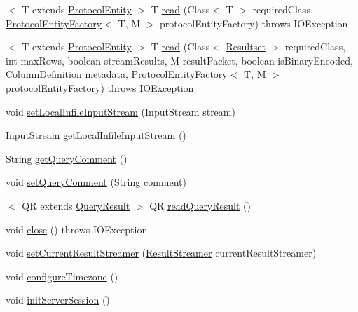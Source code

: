 \begin{DoxyCompactItemize}
$<$ T extends \mbox{\hyperlink{interfacecom_1_1mysql_1_1cj_1_1protocol_1_1_protocol_entity}{Protocol\+Entity}} $>$ T \mbox{\hyperlink{interfacecom_1_1mysql_1_1cj_1_1protocol_1_1_protocol_a48ee5ee3c590b73b47b2094694730319}{read}} (Class$<$ T $>$ required\+Class, \mbox{\hyperlink{interfacecom_1_1mysql_1_1cj_1_1protocol_1_1_protocol_entity_factory}{Protocol\+Entity\+Factory}}$<$ T, M $>$ protocol\+Entity\+Factory)  throws I\+O\+Exception
\item 
$<$ T extends \mbox{\hyperlink{interfacecom_1_1mysql_1_1cj_1_1protocol_1_1_protocol_entity}{Protocol\+Entity}} $>$ T \mbox{\hyperlink{interfacecom_1_1mysql_1_1cj_1_1protocol_1_1_protocol_ae33a71067b314435408526d35f521207}{read}} (Class$<$ \mbox{\hyperlink{interfacecom_1_1mysql_1_1cj_1_1protocol_1_1_resultset}{Resultset}} $>$ required\+Class, int max\+Rows, boolean stream\+Results, M result\+Packet, boolean is\+Binary\+Encoded, \mbox{\hyperlink{interfacecom_1_1mysql_1_1cj_1_1protocol_1_1_column_definition}{Column\+Definition}} metadata, \mbox{\hyperlink{interfacecom_1_1mysql_1_1cj_1_1protocol_1_1_protocol_entity_factory}{Protocol\+Entity\+Factory}}$<$ T, M $>$ protocol\+Entity\+Factory)  throws I\+O\+Exception
\item 
void \mbox{\hyperlink{interfacecom_1_1mysql_1_1cj_1_1protocol_1_1_protocol_a995483a591a66d63e273140ef0ac47e7}{set\+Local\+Infile\+Input\+Stream}} (Input\+Stream stream)
\item 
Input\+Stream \mbox{\hyperlink{interfacecom_1_1mysql_1_1cj_1_1protocol_1_1_protocol_a14849c71b76edabc8dae60d7c22d9fee}{get\+Local\+Infile\+Input\+Stream}} ()
\item 
String \mbox{\hyperlink{interfacecom_1_1mysql_1_1cj_1_1protocol_1_1_protocol_a8a25c27a012f47ca25de357e65829884}{get\+Query\+Comment}} ()
\item 
void \mbox{\hyperlink{interfacecom_1_1mysql_1_1cj_1_1protocol_1_1_protocol_ace5604859b8b79df6dcf91bee7c1cc6c}{set\+Query\+Comment}} (String comment)
\item 
$<$ QR extends \mbox{\hyperlink{interfacecom_1_1mysql_1_1cj_1_1_query_result}{Query\+Result}} $>$ QR \mbox{\hyperlink{interfacecom_1_1mysql_1_1cj_1_1protocol_1_1_protocol_a4c6224539df13885a570b5865377ef01}{read\+Query\+Result}} ()
\item 
void \mbox{\hyperlink{interfacecom_1_1mysql_1_1cj_1_1protocol_1_1_protocol_ac38e74b2af853f10e7f9a97f6c4836f8}{close}} ()  throws I\+O\+Exception
\item 
void \mbox{\hyperlink{interfacecom_1_1mysql_1_1cj_1_1protocol_1_1_protocol_a3923a0d582d653fae714775c3ae6db13}{set\+Current\+Result\+Streamer}} (\mbox{\hyperlink{interfacecom_1_1mysql_1_1cj_1_1protocol_1_1_result_streamer}{Result\+Streamer}} current\+Result\+Streamer)
\item 
void \mbox{\hyperlink{interfacecom_1_1mysql_1_1cj_1_1protocol_1_1_protocol_a21ceb9181ddbbf615ead4ad2e24e5544}{configure\+Timezone}} ()
\item 
void \mbox{\hyperlink{interfacecom_1_1mysql_1_1cj_1_1protocol_1_1_protocol_ab0e2c37f1f3ab785fee8c60abd7f9e9a}{init\+Server\+Session}} ()
\end{DoxyCompactItemize}


